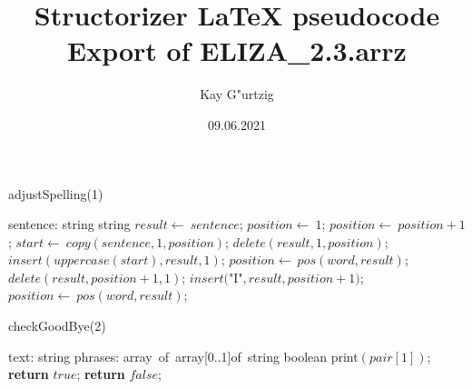 \documentclass[a4paper,10pt]{article}
\title{Structorizer LaTeX pseudocode Export of ELIZA\_2.3.arrz}
\author{Kay G"urtzig}
\date{09.06.2021}
\begin{document}
\begin{algorithm}
\caption{adjustSpelling(1)}
\begin{algorithmic}[5]
\State {}
    \State sentence: string
  \EndDecl
    \State string
  \EndDecl
  \State \(result\gets\ sentence\);
  \State \(position\gets\ 1\);
    \State \(position\gets\ position+1\);
  \EndWhile
    \State \(start\gets\ copy(sentence,1,position)\);
    \State \(delete(result,1,position)\);
    \State \(insert(uppercase(start),result,1)\);
  \EndIf
    \State \(position\gets\ pos(word,result)\);
      \State \(delete(result,position+1,1)\);
      \State \(insert(\)"{}I"{}\(,result,position+1)\);
      \State \(position\gets\ pos(word,result)\);
    \EndWhile
  \EndFor
\EndFunction
\end{algorithmic}
\end{algorithm}


\begin{algorithm}
\caption{checkGoodBye(2)}
\begin{algorithmic}[5]
\State {}
\State {}
\State {}
\State {}
    \State text: string
    \State phrases: array\ of\ array[0..1]of\ string
  \EndDecl
    \State boolean
  \EndDecl
      \State \(\)print\((pair[1])\);
      \State \textbf{return} \(true\);
    \EndIf
  \EndFor
  \State \textbf{return} \(false\);
\EndFunction
\end{algorithmic}
\end{algorithm}
\end{document}
